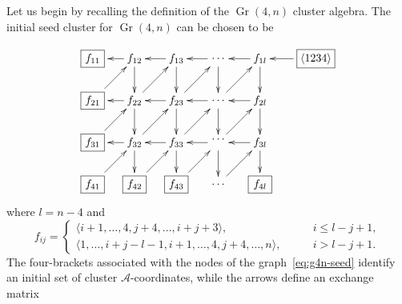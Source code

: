 \documentclass[11pt]{article}
\DeclareMathOperator{\Gr}{Gr}
\def\ket#1{\langle #1 \rangle}
\def\a{\mathcal{A}}
\begin{document}
Let us begin by recalling the definition of the $\Gr(4,n)$ cluster algebra. The initial seed cluster for $\Gr(4,n)$ can be chosen to be~\cite{1088.22009}

\begin{equation}\label{eq:g4n-seed}
\begin{gathered}
\begin{xy} 0;<-.5pt,0pt>:<0pt,-.5pt>::
	(-100,0) *+{\framebox[8ex]{$\ket{1234}$}} ="-1",
	(0,0) *+{f_{1l}} ="0",
	(75,0) *+{\color{white} f_{00}} ="1",
	(150,0) *+{f_{13}} ="2",
	(225,0) *+{f_{12}} ="3",
	(300,0) *+{\framebox[5ex]{$f_{11}$}} ="4",
	(0,75) *+{f_{2l}} ="5",
	(75,75) *+{\color{white} f_{00}} ="6",
	(150,75) *+{f_{23}} ="7",
	(225,75) *+{f_{22}} ="8",
	(300,75) *+{\framebox[5ex]{$f_{21}$}} ="9",
	(0,150) *+{f_{3l}} ="10",
	(75,150) *+{\color{white} f_{00}} ="11",
	(150,150) *+{f_{33}} ="12",
	(225,150) *+{f_{32}} ="13",
	(300,150) *+{\framebox[5ex]{$f_{31}$}} ="14",
	(0,225) *+{\framebox[5ex]{$f_{4l}$}} ="15",
	(75,225) *+{\color{white} f_{00}} ="16",
	(150,225) *+{\framebox[5ex]{$f_{43}$}} ="17",
	(225,225) *+{\framebox[5ex]{$f_{42}$}} ="18",
	(300,225) *+{\framebox[5ex]{$f_{41}$}} ="19",
	(75,0) *+{\cdots} ="01",
	(75,75) *+{\cdots} ="06",
	(75,144) *+{\cdots} ="011",
	(75,225) *+{\cdots} ="016",
	"-1", {\ar"0"},
	"0", {\ar"1"},
	"0", {\ar"5"},
	"6", {\ar"0"},
	"1", {\ar"2"},
	"2", {\ar"3"},
	"2", {\ar"7"},
	"8", {\ar"2"},
	"3", {\ar"4"},
	"3", {\ar"8"},
	"9", {\ar"3"},
	"5", {\ar"6"},
	"6", {\ar"7"},
	"7", {\ar"8"},
	"8", {\ar"9"},
	"13", {\ar"7"},
	"7", {\ar"12"},
	"8", {\ar"13"},
	"5", {\ar"10"},
	"14", {\ar"8"},
	"10", {\ar"15"},
	"12", {\ar"17"},
	"19", {\ar"13"},
	"18", {\ar"12"},
	"13", {\ar"18"},
	"17", {\ar"11"},
	"16", {\ar"10"},
	"13", {\ar"14"},
	"12", {\ar"13"},
	"11", {\ar"12"},
	"10", {\ar"11"},
	"7", {\ar"1"},
	"11", {\ar"5"},
	"12", {\ar"6"},
	"1", {\ar"6"},
	"6", {\ar"11"},
	"11", {\ar"16"},
\end{xy}
\end{gathered} 
\end{equation}
where $l=n-4$ and 
\begin{equation}
  f_{i j} =
  \begin{cases}
    \langle i+1, \dotsc, 4, j + 4, \dotsc, i+j+3\rangle, \qquad &i \leq l-j+1,\\
    \langle 1, \dotsc, i+j-l-1, i+1, \dotsc, 4, j+4, \dotsc, n\rangle, \qquad &i >l-j+1.
  \end{cases}
\end{equation}
The four-brackets associated with the nodes of the graph~\eqref{eq:g4n-seed} identify an initial set of cluster $\a$-coordinates, while the arrows define an exchange matrix 
\end{document}
